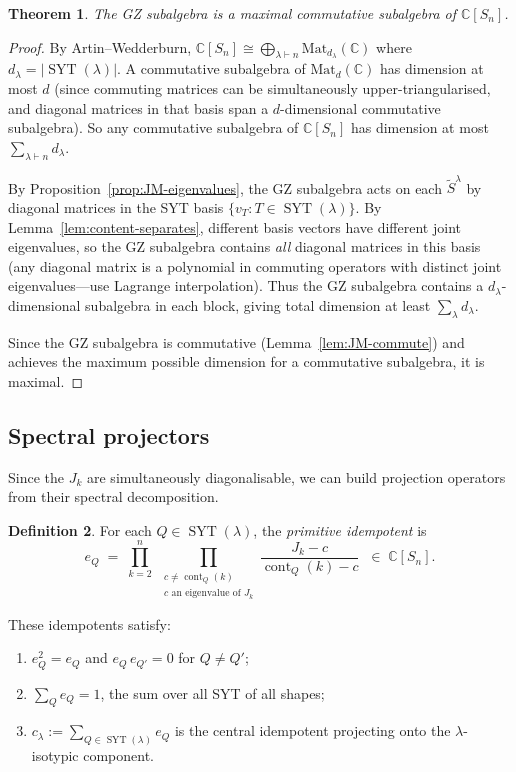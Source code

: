 \documentclass[12pt,a4paper]{article}
\newtheorem{theorem}{Theorem}[section]
\theoremstyle{definition}
\newtheorem{definition}[theorem]{Definition}
\theoremstyle{remark}
\newcommand{\C}{\mathbb{C}}
\newcommand{\SYT}{\operatorname{SYT}}
\newcommand{\cont}{\operatorname{cont}}
\begin{document}
\begin{theorem}\label{thm:GZ-maximal}
The GZ subalgebra is a maximal commutative subalgebra of $\C[S_n]$.
\end{theorem}

\begin{proof}
By Artin--Wedderburn, $\C[S_n] \cong \bigoplus_{\lambda \vdash n}
\mathrm{Mat}_{d_\lambda}(\C)$ where $d_\lambda = |\SYT(\lambda)|$.
A commutative subalgebra of $\mathrm{Mat}_d(\C)$ has dimension at most
$d$ (since commuting matrices can be simultaneously
upper-triangularised, and diagonal matrices in that basis span a
$d$-dimensional commutative subalgebra). So any commutative
subalgebra of $\C[S_n]$ has dimension at most
$\sum_{\lambda \vdash n} d_\lambda$.

By Proposition~\ref{prop:JM-eigenvalues}, the GZ subalgebra acts on
each $\widetilde{S}^\lambda$ by diagonal matrices in the SYT basis
$\{v_T : T \in \SYT(\lambda)\}$. By
Lemma~\ref{lem:content-separates}, different basis vectors have
different joint eigenvalues, so the GZ subalgebra contains \emph{all}
diagonal matrices in this basis (any diagonal matrix is a polynomial
in commuting operators with distinct joint eigenvalues---use Lagrange
interpolation). Thus the GZ subalgebra contains a
$d_\lambda$-dimensional subalgebra in each block, giving total
dimension at least $\sum_\lambda d_\lambda$.

Since the GZ subalgebra is commutative
(Lemma~\ref{lem:JM-commute}) and achieves the maximum possible
dimension for a commutative subalgebra, it is maximal.
\end{proof}

\subsection{Spectral projectors}

Since the $J_k$ are simultaneously diagonalisable, we can build
projection operators from their spectral decomposition.

\begin{definition}\label{def:primitive-idempotent}
For each $Q \in \SYT(\lambda)$, the \emph{primitive idempotent} is
\[
  e_Q \;=\; \prod_{k=2}^{n}\;\prod_{\substack{c \neq \cont_Q(k) \\
    c \text{ an eigenvalue of } J_k}}
    \frac{J_k - c}{\cont_Q(k) - c}
  \;\;\in\; \C[S_n].
\]
\end{definition}

These idempotents satisfy:
\begin{enumerate}[label=(\roman*)]
\item $e_Q^2 = e_Q$ and $e_Q \, e_{Q'} = 0$ for $Q \neq Q'$;
\item $\displaystyle\sum_{Q} e_Q = 1$, the sum over all SYT of all
  shapes;
\item $c_\lambda := \displaystyle\sum_{Q \in \SYT(\lambda)} e_Q$ is the
  central idempotent projecting onto the $\lambda$-isotypic component.
\end{enumerate}
\end{document}
